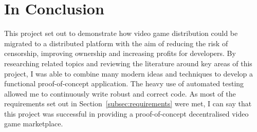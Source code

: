 \section{In Conclusion}

This project set out to demonstrate how video game distribution could be migrated to a distributed platform with the aim of reducing the risk of censorship, improving ownership and increasing profits for developers.
\x
By researching related topics and reviewing the literature around key areas of this project, I was able to combine many modern ideas and techniques to develop a functional proof-of-concept application. The heavy use of automated testing allowed me to continuously write robust and correct code.
\x
As most of the requirements set out in Section~\ref{subsec:requirements} were met, I can say that this project was successful in providing a proof-of-concept decentralised video game marketplace.
